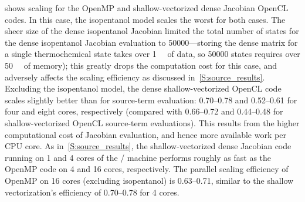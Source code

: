 \documentclass[12pt,number,sort&compress,preprint]{elsarticle}
\begin{document}
 shows scaling for the OpenMP and shallow-vectorized dense Jacobian OpenCL codes.
In this case, the isopentanol model scales the worst for both cases.
The sheer size of the dense isopentanol Jacobian limited the total number of states for the dense isopentanol Jacobian evaluation to \num{50000}---storing the dense matrix for a single thermochemical state takes over \SI{1}{\mega\byte} of data, so \num{50000} states requires over \SI{50}{\giga\byte} of memory); this greatly drops the computation cost for this case, and adversely affects the scaling efficiency as discussed in~\cref{S:source_results}.
Excluding the isopentanol model, the dense shallow-vectorized OpenCL code scales slightly better than for source-term evaluation: \numrange{0.70}{0.78} and \numrange{0.52}{0.61} for four and eight cores, respectively (compared with \numrange{0.66}{0.72} and \numrange{0.44}{0.48} for shallow-vectorized OpenCL source-term evaluations).
This results from the higher computational cost of Jacobian evaluation, and hence more available work per CPU core.
As in~\cref{S:source_results}, the shallow-vectorized dense Jacobian code running on \num{1} and \num{4} cores of the \avx/ machine performs roughly as fast as the OpenMP code on \num{4} and \num{16} cores, respectively.
The parallel scaling efficiency of OpenMP on \num{16} cores (excluding isopentanol) is \numrange{0.63}{0.71}, similar to the shallow vectorization's efficiency of \numrange{0.70}{0.78} for \num{4} cores.
\end{document}
